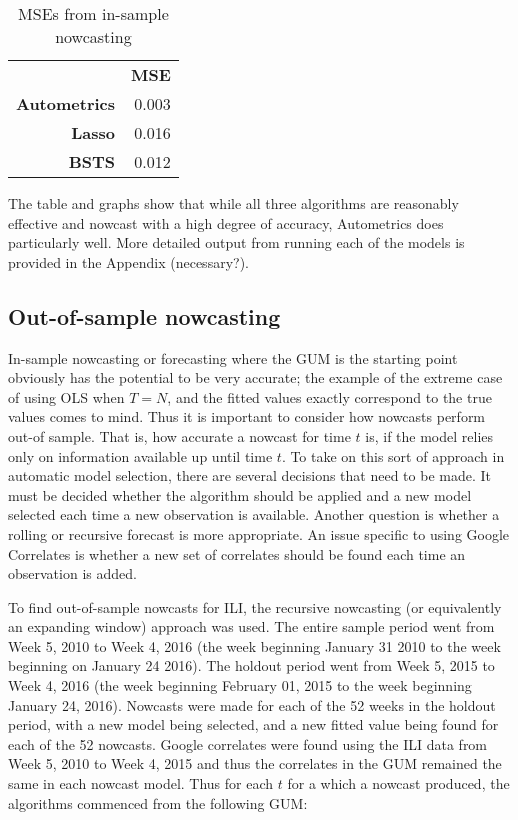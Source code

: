 \documentclass[11pt, oneside]{book}   	%
\begin{document}
\begin{table}
\centering
\begin{tabular}{rr}
 & \textbf{MSE} \\
\textbf{Autometrics} & 0.003 \\
\textbf{Lasso} & 0.016\\
\textbf{BSTS} & 0.012  \\
    \end{tabular}%
      \caption{MSEs from in-sample nowcasting}
  \label{MSEinsample}%
\end{table}%

The table and graphs show that while all three algorithms are reasonably effective and nowcast with a high degree of accuracy, Autometrics does particularly well. More detailed output from running each of the models is provided in the Appendix (necessary?).

\subsection{Out-of-sample nowcasting}

In-sample nowcasting or forecasting where the GUM is the starting point obviously has the potential to be very accurate; the example of the extreme case of using OLS when $T=N$, and the fitted values exactly correspond to the true values comes to mind. Thus it is important to consider how nowcasts perform out-of sample. That is, how accurate a nowcast for time $t$ is, if the model relies only on information available up until time $t$. To take on this sort of approach in automatic model selection, there are several decisions that need to be made. It must be decided whether the algorithm should be applied and a new model selected each time a new observation is available. Another question is whether a rolling  or recursive forecast is more appropriate. An issue specific to using Google Correlates is whether a new set of correlates should be found each time an observation is added. 

To find out-of-sample nowcasts for ILI, the recursive nowcasting (or equivalently an expanding window) approach was used. The entire sample period went from Week 5, 2010 to Week 4, 2016 (the week beginning January 31 2010 to the week beginning on January 24 2016). The holdout period went from Week 5, 2015 to Week 4, 2016 (the week beginning February 01, 2015 to the week beginning January 24, 2016). Nowcasts were made for each of the 52 weeks in the holdout period, with a new model being selected, and a new fitted value being found for each of the 52 nowcasts. Google correlates were found using the ILI data from Week 5, 2010 to Week 4, 2015 and thus the correlates in the GUM remained the same in each nowcast model. Thus for each $t$ for a which a nowcast produced, the algorithms commenced from the following GUM:
\end{document}
